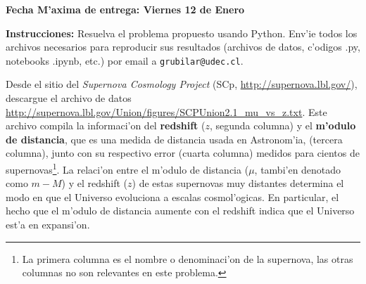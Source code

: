 \documentclass[11pt]{exam}
\begin{document}
\firstpageheadrule
\runningheadrule
{}
\cfoot{ }
\begin{flushleft}
\vspace{0.2in}
\vspace{0.25cm}
\end{flushleft}

\begin{center}
\textbf{Fecha M'axima de entrega: Viernes 12 de Enero}
\end{center}
\textbf{Instrucciones:} Resuelva el problema propuesto usando Python. Env'ie todos los archivos necesarios para reproducir sus resultados (archivos de datos, c'odigos .py, notebooks .ipynb, etc.) por email a \texttt{grubilar@udec.cl}.

\bigskip


 Desde el sitio del \textit{Supernova Cosmology Project} (SCp,
\url{http://supernova.lbl.gov/}), descargue el archivo de datos  \url{http://supernova.lbl.gov/Union/figures/SCPUnion2.1_mu_vs_z.txt}.
Este archivo compila la informaci'on del \textbf{redshift} ($z$, segunda columna) y el \textbf{m'odulo de distancia}, que es una medida de distancia usada en Astronom'ia, (tercera columna), junto con su respectivo error (cuarta columna) medidos para cientos
de supernovas\footnote{La primera columna es el nombre o denominaci'on de
la supernova, las otras columnas no son relevantes en este problema.}.
La relaci'on entre el m'odulo de distancia ($\mu$, tambi'en denotado como $m-M$) y el redshift ($z$) de estas
supernovas muy distantes determina el modo en que el Universo evoluciona a escalas cosmol'ogicas. En particular, el hecho que el m'odulo de distancia aumente con el redshift indica que el Universo est'a en expansi'on. 
\end{document}
